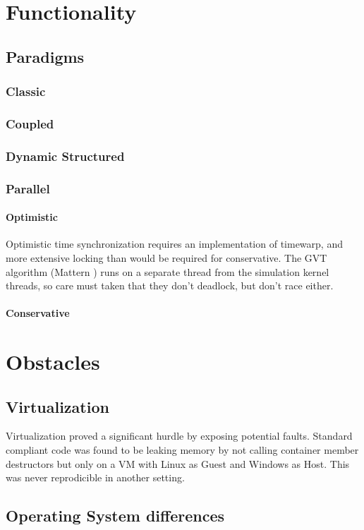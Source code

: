 \documentclass[8pt,a4paper]{report}
\begin{document}
\chapter{Functionality}
\section{Paradigms}
\subsection{Classic}
\subsection{Coupled}
\subsection{Dynamic Structured}
\subsection{Parallel}
\subsubsection{Optimistic}
Optimistic time synchronization requires an implementation of timewarp, and more extensive locking than would be required for conservative. The GVT algorithm (Mattern \cite{Mattern}) runs on a separate thread from the simulation kernel threads, so care must taken that they don't deadlock, but don't race either.
\subsubsection{Conservative}


\chapter{Obstacles}
\section{Virtualization}
Virtualization proved a significant hurdle by exposing potential faults. Standard compliant code was found to be leaking memory by not calling container member destructors but only on a VM with Linux as Guest and Windows as Host. This was never reprodicible in another setting.
\section{Operating System differences}
\end{document}

